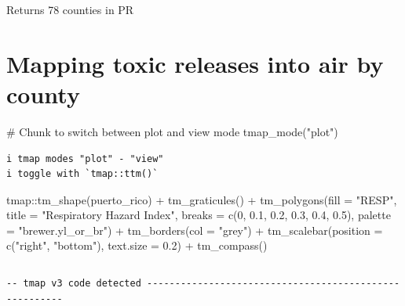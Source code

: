 \documentclass[
  letterpaper,
  DIV=11,
  numbers=noendperiod]{scrartcl}
\newenvironment{Shaded}{\begin{snugshade}}{\end{snugshade}}
\newcommand{\AttributeTok}[1]{\textcolor[rgb]{0.40,0.45,0.13}{#1}}
\newcommand{\CommentTok}[1]{\textcolor[rgb]{0.37,0.37,0.37}{#1}}
\newcommand{\DecValTok}[1]{\textcolor[rgb]{0.68,0.00,0.00}{#1}}
\newcommand{\FloatTok}[1]{\textcolor[rgb]{0.68,0.00,0.00}{#1}}
\newcommand{\FunctionTok}[1]{\textcolor[rgb]{0.28,0.35,0.67}{#1}}
\newcommand{\NormalTok}[1]{\textcolor[rgb]{0.00,0.23,0.31}{#1}}
\newcommand{\SpecialCharTok}[1]{\textcolor[rgb]{0.37,0.37,0.37}{#1}}
\newcommand{\StringTok}[1]{\textcolor[rgb]{0.13,0.47,0.30}{#1}}
\begin{document}
Returns 78 counties in PR

\section{Mapping toxic releases into air by
county}\label{mapping-toxic-releases-into-air-by-county}

\begin{Shaded}
\begin{Highlighting}[]
\CommentTok{\# Chunk to switch between plot and view mode}
\FunctionTok{tmap\_mode}\NormalTok{(}\StringTok{"plot"}\NormalTok{)}
\end{Highlighting}
\end{Shaded}

\begin{verbatim}
i tmap modes "plot" - "view"
i toggle with `tmap::ttm()`
\end{verbatim}

\begin{Shaded}
\begin{Highlighting}[]
\NormalTok{tmap}\SpecialCharTok{::}\FunctionTok{tm\_shape}\NormalTok{(puerto\_rico) }\SpecialCharTok{+}
  \FunctionTok{tm\_graticules}\NormalTok{() }\SpecialCharTok{+}
  \FunctionTok{tm\_polygons}\NormalTok{(}\AttributeTok{fill =} \StringTok{"RESP"}\NormalTok{, }
              \AttributeTok{title =} \StringTok{"Respiratory Hazard Index"}\NormalTok{,}
              \AttributeTok{breaks =} \FunctionTok{c}\NormalTok{(}\DecValTok{0}\NormalTok{, }\FloatTok{0.1}\NormalTok{, }\FloatTok{0.2}\NormalTok{, }\FloatTok{0.3}\NormalTok{, }\FloatTok{0.4}\NormalTok{, }\FloatTok{0.5}\NormalTok{), }
              \AttributeTok{palette =} \StringTok{"brewer.yl\_or\_br"}\NormalTok{) }\SpecialCharTok{+} 
  \FunctionTok{tm\_borders}\NormalTok{(}\AttributeTok{col =} \StringTok{"grey"}\NormalTok{) }\SpecialCharTok{+}
  \FunctionTok{tm\_scalebar}\NormalTok{(}\AttributeTok{position =} \FunctionTok{c}\NormalTok{(}\StringTok{"right"}\NormalTok{, }\StringTok{"bottom"}\NormalTok{), }
              \AttributeTok{text.size =} \FloatTok{0.2}\NormalTok{) }\SpecialCharTok{+}
  \FunctionTok{tm\_compass}\NormalTok{()}
\end{Highlighting}
\end{Shaded}

\begin{verbatim}
\end{verbatim}

\begin{verbatim}
-- tmap v3 code detected -------------------------------------------------------
\end{verbatim}
\end{document}
